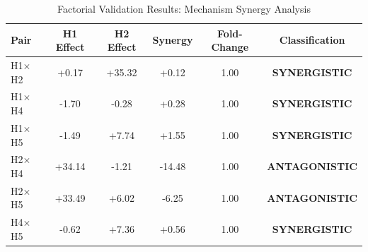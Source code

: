 
\begin{table}[h]
\centering
\caption{Factorial Validation Results: Mechanism Synergy Analysis}
\label{tab:factorial_results}
\begin{tabular}{lccccc}
\hline
Pair & H1 Effect & H2 Effect & Synergy & Fold-Change & Classification \\
\hline
H1$\times$H2 & +0.17 & +35.32 & +0.12 & 1.00 & \textbf{SYNERGISTIC} \\
H1$\times$H4 & -1.70 & -0.28 & +0.28 & 1.00 & \textbf{SYNERGISTIC} \\
H1$\times$H5 & -1.49 & +7.74 & +1.55 & 1.00 & \textbf{SYNERGISTIC} \\
H2$\times$H4 & +34.14 & -1.21 & -14.48 & 1.00 & \textbf{ANTAGONISTIC} \\
H2$\times$H5 & +33.49 & +6.02 & -6.25 & 1.00 & \textbf{ANTAGONISTIC} \\
H4$\times$H5 & -0.62 & +7.36 & +0.56 & 1.00 & \textbf{SYNERGISTIC} \\
\hline
\end{tabular}
\end{table}
